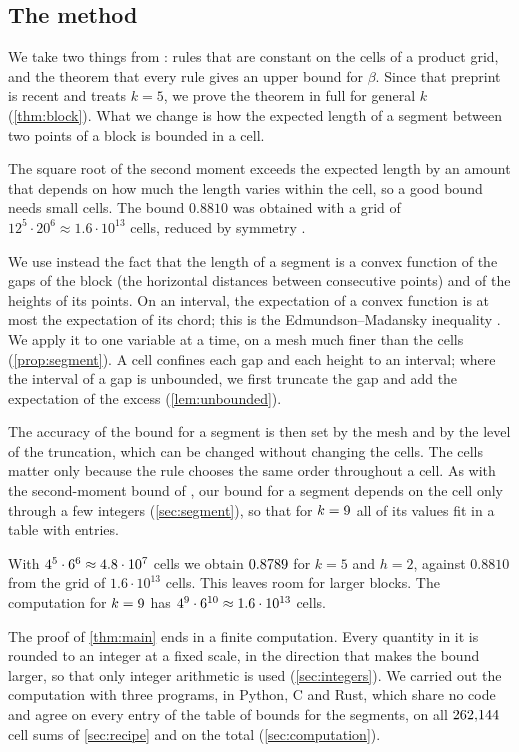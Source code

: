 \subsection{The method}

We take two things from \cite{DongCao2026}: rules that are constant on the cells of a product grid, and the theorem that every rule gives an upper bound for $\beta$. Since that preprint is recent and treats $k=5$, we prove the theorem in full for general $k$ (\cref{thm:block}). What we change is how the expected length of a segment between two points of a block is bounded in a cell.

The square root of the second moment exceeds the expected length by an amount that depends on how much the length varies within the cell, so a good bound needs small cells. The bound $0.8810$ was obtained with a grid of $12^5\cdot20^6\approx1.6\cdot10^{13}$ cells, reduced by symmetry \cite{DongCao2026}.

We use instead the fact that the length of a segment is a convex function of the gaps of the block (the horizontal distances between consecutive points) and of the heights of its points. On an interval, the expectation of a convex function is at most the expectation of its chord; this is the Edmundson--Madansky inequality \cite{Edmundson1957,Madansky1959}. We apply it to one variable at a time, on a mesh much finer than the cells (\cref{prop:segment}). A cell confines each gap and each height to an interval; where the interval of a gap is unbounded, we first truncate the gap and add the expectation of the excess (\cref{lem:unbounded}).

The accuracy of the bound for a segment is then set by the mesh and by the level of the truncation, which can be changed without changing the cells. The cells matter only because the rule chooses the same order throughout a cell. As with the second-moment bound of \cite{DongCao2026}, our bound for a segment depends on the cell only through a few integers (\cref{sec:segment}), so that for $k=9$ all of its values fit in a table with \MainTableEntries{} entries.

With $4^5\cdot6^6\approx4.8\cdot10^{7}$ cells we obtain $0.8789$ for $k=5$ and $h=2$, against $0.8810$ from the grid of $1.6\cdot10^{13}$ cells. This leaves room for larger blocks. The computation for $k=9$ has $4^{9}\cdot6^{10}\approx1.6\cdot10^{13}$ cells\MainCellsRemark.

The proof of \cref{thm:main} ends in a finite computation. Every quantity in it is rounded to an integer at a fixed scale, in the direction that makes the bound larger, so that only integer arithmetic is used (\cref{sec:integers}). We carried out the computation with three programs, in Python, C and Rust, which share no code and agree on every entry of the table of bounds for the segments, on all $262{,}144$ cell sums of \cref{sec:recipe} and on the total (\cref{sec:computation}).

